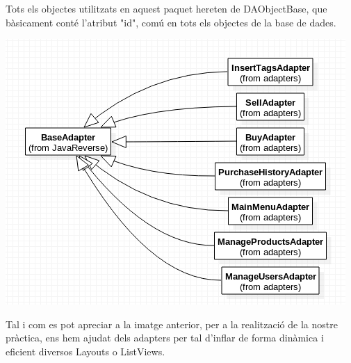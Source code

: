 \documentclass{article}
\begin{document}
Tots els objectes utilitzats en aquest paquet hereten de DAObjectBase, que bàsicament conté l'atribut "id", comú en tots els objectes de la base de dades.
	\begin{center}
	\includegraphics[scale=0.5]{img/2.png}
	 \end{center}
	 	 Tal i com es pot apreciar a la imatge anterior, per a la realització de la nostre pràctica, ens hem ajudat dels adapters per tal d'inflar de forma dinàmica i eficient diversos Layouts o ListViews.\\
	
\end{document}
